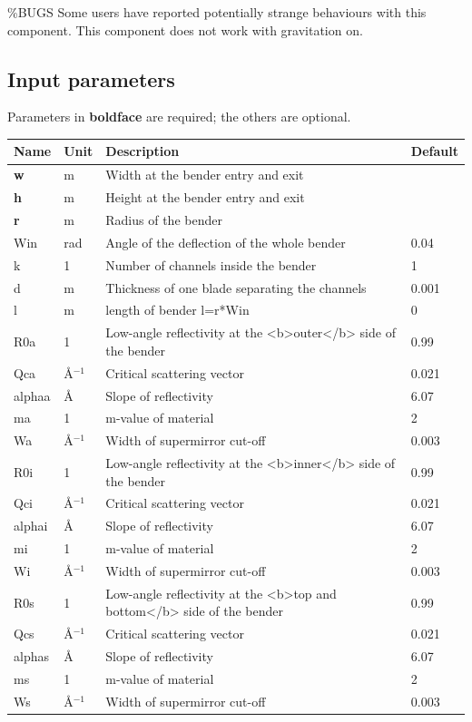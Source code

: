 \%BUGS Some users have reported potentially strange behaviours with this component. This component does not work with gravitation on.

\subsection*{Input parameters}
Parameters in \textbf{boldface} are required; the others are optional.

\begin{longtable}{p{}p{}p{}p{}}
\toprule
\textbf{Name} & \textbf{Unit} & \textbf{Description} & \textbf{Default} \\
\midrule
\endhead
\textbf{w} & m & Width at the bender entry and exit &  \\
\textbf{h} & m & Height at the bender entry and exit &  \\
\textbf{r} & m & Radius of the bender &  \\
Win & rad & Angle of the deflection of the whole bender & 0.04 \\
k & 1 & Number of channels inside the bender & 1 \\
d & m & Thickness of one blade separating the channels & 0.001 \\
l & m & length of bender l=r*Win & 0 \\
R0a & 1 & Low-angle reflectivity at the \textless{}b\textgreater{}outer\textless{}/b\textgreater{} side of the bender & 0.99 \\
Qca & \AA{}$^{-1}$ & Critical scattering vector & 0.021 \\
alphaa & \AA{} & Slope of reflectivity & 6.07 \\
ma & 1 & m-value of material & 2 \\
Wa & \AA{}$^{-1}$ & Width of supermirror cut-off & 0.003 \\
R0i & 1 & Low-angle reflectivity at the \textless{}b\textgreater{}inner\textless{}/b\textgreater{} side of the bender & 0.99 \\
Qci & \AA{}$^{-1}$ & Critical scattering vector & 0.021 \\
alphai & \AA{} & Slope of reflectivity & 6.07 \\
mi & 1 & m-value of material & 2 \\
Wi & \AA{}$^{-1}$ & Width of supermirror cut-off & 0.003 \\
R0s & 1 & Low-angle reflectivity at the \textless{}b\textgreater{}top and bottom\textless{}/b\textgreater{} side of the bender & 0.99 \\
Qcs & \AA{}$^{-1}$ & Critical scattering vector & 0.021 \\
alphas & \AA{} & Slope of reflectivity & 6.07 \\
ms & 1 & m-value of material & 2 \\
Ws & \AA{}$^{-1}$ & Width of supermirror cut-off & 0.003 \\
\bottomrule
\end{longtable}

